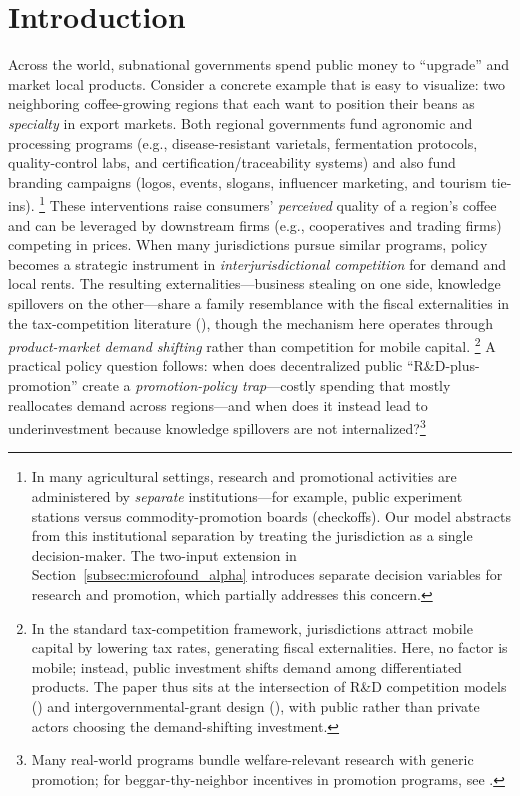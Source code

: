 \documentclass[sn-mathphys-ay]{sn-jnl} %
\theoremstyle{remark}
\begin{document}
\section{Introduction} 
\label{sec:intro}
Across the world, subnational governments spend public money to “upgrade” and market local products.
Consider a concrete example that is easy to visualize: two neighboring coffee-growing regions that each want to position their beans as \emph{specialty} in export markets.
Both regional governments fund agronomic and processing programs (e.g., disease-resistant varietals, fermentation protocols, quality-control labs, and certification/traceability systems) and also fund branding campaigns (logos, events, slogans, influencer marketing, and tourism tie-ins).%
\footnote{In many agricultural settings, research and promotional activities are administered by \emph{separate} institutions---for example, public experiment stations versus commodity-promotion boards (checkoffs). Our model abstracts from this institutional separation by treating the jurisdiction as a single decision-maker. The two-input extension in Section~\ref{subsec:microfound_alpha} introduces separate decision variables for research and promotion, which partially addresses this concern.}
These interventions raise consumers’ \emph{perceived} quality of a region’s coffee and can be leveraged by downstream firms (e.g., cooperatives and trading firms) competing in prices.
When many jurisdictions pursue similar programs, policy becomes a strategic instrument in \emph{interjurisdictional competition} for demand and local rents.  The resulting externalities---business stealing on one side, knowledge spillovers on the other---share a family resemblance with the fiscal externalities in the tax-competition literature (\citealp{Tiebout1956,Wilson1986,ZodrowMieszkowski1986,Wildasin1988,KeenMarchand1997}), though the mechanism here operates through \emph{product-market demand shifting} rather than competition for mobile capital.%
\footnote{In the standard tax-competition framework, jurisdictions attract mobile capital by lowering tax rates, generating fiscal externalities.  Here, no factor is mobile; instead, public investment shifts demand among differentiated products.  The paper thus sits at the intersection of R\&D competition models (\citealp{dAspremontJacquemin1988,KamienMullerZang1992}) and intergovernmental-grant design (\citealp{Wildasin1984,Wildasin1989}), with public rather than private actors choosing the demand-shifting investment.}
A practical policy question follows: when does decentralized public “R\&D-plus-promotion” create a \emph{promotion-policy trap}---costly spending that mostly reallocates demand across regions---and when does it instead lead to underinvestment because knowledge spillovers are not internalized?\footnote{Many real-world programs bundle welfare-relevant research with generic promotion; for beggar-thy-neighbor incentives in promotion programs, see \citealp{AlstonFreebairnJames2001}.}
\end{document}
